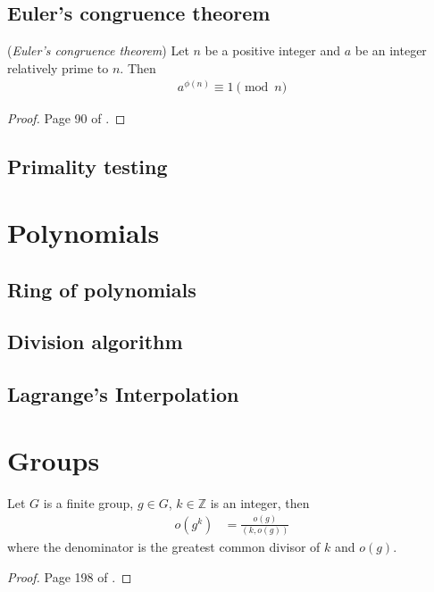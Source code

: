 \documentclass[a4paper, 12pt]{book} %
\begin{document}
\section{Euler's congruence theorem}

\begin{theorem}
    (\emph{Euler's congruence theorem}) Let $n$ be a positive integer and $a$ be an integer relatively prime to $n$. Then
    \begin{align}
        a^{\phi(n)} \equiv 1 \pmod{n}
    \end{align}
\end{theorem}
\begin{proof}
    Page 90 of \cite{rubinstein2018cryptography}.
\end{proof}


\section{Primality testing}

\chapter{Polynomials}
\section{Ring of polynomials}
\section{Division algorithm}
\section{Lagrange's Interpolation}


\chapter{Groups}


\begin{proposition}
    Let $G$ is a finite group, $g \in G$, $k \in \mathbb{Z}$ is an integer, then
    \begin{align}
        o(g^k) &= \frac{o(g)}{(k, o(g))}
    \end{align}
    where the denominator is the greatest common divisor of $k$ and $o(g)$.
\end{proposition}
\begin{proof}
    Page 198 of \cite{zheng2022modern}.
\end{proof}
\end{document}
